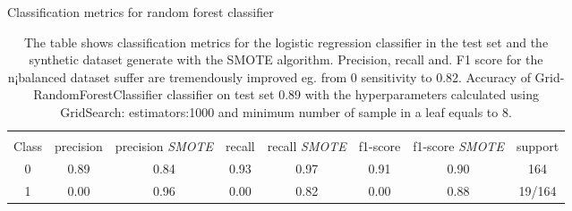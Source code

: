 \documentclass[11pt]{article}
\theoremstyle{definition}
\theoremstyle{remark}
\begin{document}

\begin{table}[H]
\caption{Classification metrics for random forest classifier} \label{tab:rf_smote} 
\begin{center} 
\begin{tabular}{cccccccc}
\hline
\multicolumn{1}{c}{} \\
Class & precision & precision \textit{SMOTE}& recall & recall \textit{SMOTE}& f1-score & f1-score \textit{SMOTE} & support     \\
\hline
0 & 0.89 & 0.84  &  0.93 & 0.97 &  0.91   & 0.90  &  164 \\
1 & 0.00  & 0.96  & 0.00   & 0.82 &  0.00   & 0.88   & 19/164 \\
\hline
\end{tabular}
\caption{The table shows classification metrics for the logistic regression classifier in the test set and the synthetic dataset generate with the SMOTE algorithm. Precision, recall and. F1 score for the n¡balanced dataset suffer are tremendously improved eg. from 0 sensitivity to 0.82. Accuracy of Grid-RandomForestClassifier classifier on test set 0.89 with the hyperparameters calculated using GridSearch: estimators:1000 and minimum number of sample in a leaf equals to 8.}
\end{center}
\end{table}

\end{document}
